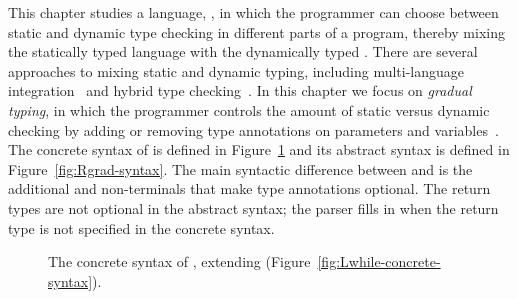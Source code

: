 \documentclass[7x10]{TimesAPriori_MIT}%
\newcommand{\gray}[1]{{\color{gray} #1}}
\begin{document}
This chapter studies a language, \LangGrad{}, in which the programmer
can choose between static and dynamic type checking in different parts
of a program, thereby mixing the statically typed \LangLoop{} language
with the dynamically typed \LangDyn{}. There are several approaches to
mixing static and dynamic typing, including multi-language
integration~\citep{Tobin-Hochstadt:2006fk,Matthews:2007zr} and hybrid
type checking~\citep{Flanagan:2006mn,Gronski:2006uq}. In this chapter
we focus on \emph{gradual typing}, in which the
programmer controls the amount of static versus dynamic checking by
adding or removing type annotations on parameters and
variables~\citep{Anderson:2002kd,Siek:2006bh}.
%
The concrete syntax of \LangGrad{} is defined in
Figure~\ref{fig:Rgrad-concrete-syntax} and its abstract syntax is defined
in Figure~\ref{fig:Rgrad-syntax}. The main syntactic difference between
\LangLoop{} and \LangGrad{} is the additional  and 
non-terminals that make type annotations optional. The return types
are not optional in the abstract syntax; the parser fills in
 when the return type is not specified in the concrete
syntax.

\begin{figure}[tp]
\centering
\fbox{
  \begin{minipage}{0.96\textwidth}
    \small
\[
\begin{array}{lcl}
  \itm{param} &::=& \Var \MID \LS\Var \key{:} \Type\RS \\
  \itm{ret} &::=& \epsilon \MID \key{:} \Type \\
  \Exp &::=& \gray{ \Int \MID \CREAD{} \MID \CNEG{\Exp}
     \MID \CADD{\Exp}{\Exp} \MID \CSUB{\Exp}{\Exp} }  \\
    &\MID&  \gray{ \Var \MID \CLET{\Var}{\Exp}{\Exp} }\\
    &\MID& \gray{\key{\#t} \MID \key{\#f} 
     \MID (\key{and}\;\Exp\;\Exp) 
     \MID (\key{or}\;\Exp\;\Exp) 
     \MID (\key{not}\;\Exp) } \\
    &\MID& \gray{ (\key{eq?}\;\Exp\;\Exp) \MID \CIF{\Exp}{\Exp}{\Exp} } \\
    &\MID& \gray{ (\key{vector}\;\Exp\ldots) \MID
          (\key{vector-ref}\;\Exp\;\Int)} \\
    &\MID& \gray{(\key{vector-set!}\;\Exp\;\Int\;\Exp)\MID (\key{void})
    \MID (\Exp \; \Exp\ldots) } \\
    &\MID& \gray{ \LP \key{procedure-arity}~\Exp\RP }
    \MID \CGLAMBDA{\LP\itm{param}\ldots\RP}{\itm{ret}}{\Exp} \\
  &\MID& \gray{ \CSETBANG{\Var}{\Exp}
  \MID \CBEGIN{\Exp\ldots}{\Exp}
  \MID \CWHILE{\Exp}{\Exp} } \\
  \Def &::=& \CGDEF{\Var}{\itm{param}\ldots}{\itm{ret}}{\Exp} \\
  \LangGradM{} &::=& \gray{\Def\ldots \; \Exp}
\end{array}
\]
\end{minipage}
}
\caption{The concrete syntax of \LangGrad{}, extending \LangLoop{} (Figure~\ref{fig:Lwhile-concrete-syntax}).}
\label{fig:Rgrad-concrete-syntax}
\end{figure}
\end{document}
